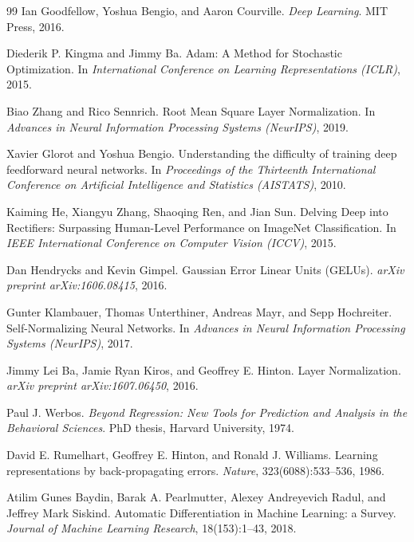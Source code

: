 \documentclass{article}
\begin{document}
\begin{thebibliography}{99}
Ian Goodfellow, Yoshua Bengio, and Aaron Courville.
\newblock \emph{Deep Learning}.
\newblock MIT Press, 2016.

Diederik P. Kingma and Jimmy Ba.
\newblock Adam: A Method for Stochastic Optimization.
\newblock In \emph{International Conference on Learning Representations (ICLR)}, 2015.

Biao Zhang and Rico Sennrich.
\newblock Root Mean Square Layer Normalization.
\newblock In \emph{Advances in Neural Information Processing Systems (NeurIPS)}, 2019.

Xavier Glorot and Yoshua Bengio.
\newblock Understanding the difficulty of training deep feedforward neural networks.
\newblock In \emph{Proceedings of the Thirteenth International Conference on Artificial Intelligence and Statistics (AISTATS)}, 2010.

Kaiming He, Xiangyu Zhang, Shaoqing Ren, and Jian Sun.
\newblock Delving Deep into Rectifiers: Surpassing Human-Level Performance on ImageNet Classification.
\newblock In \emph{IEEE International Conference on Computer Vision (ICCV)}, 2015.

Dan Hendrycks and Kevin Gimpel.
\newblock Gaussian Error Linear Units (GELUs).
\newblock \emph{arXiv preprint arXiv:1606.08415}, 2016.

Gunter Klambauer, Thomas Unterthiner, Andreas Mayr, and Sepp Hochreiter.
\newblock Self-Normalizing Neural Networks.
\newblock In \emph{Advances in Neural Information Processing Systems (NeurIPS)}, 2017.

Jimmy Lei Ba, Jamie Ryan Kiros, and Geoffrey E. Hinton.
\newblock Layer Normalization.
\newblock \emph{arXiv preprint arXiv:1607.06450}, 2016.

Paul J. Werbos.
\newblock \emph{Beyond Regression: New Tools for Prediction and Analysis in the Behavioral Sciences}.
\newblock PhD thesis, Harvard University, 1974.

David E. Rumelhart, Geoffrey E. Hinton, and Ronald J. Williams.
\newblock Learning representations by back-propagating errors.
\newblock \emph{Nature}, 323(6088):533--536, 1986.

Atilim Gunes Baydin, Barak A. Pearlmutter, Alexey Andreyevich Radul, and Jeffrey Mark Siskind.
\newblock Automatic Differentiation in Machine Learning: a Survey.
\newblock \emph{Journal of Machine Learning Research}, 18(153):1--43, 2018.


\end{thebibliography}
\end{document}
